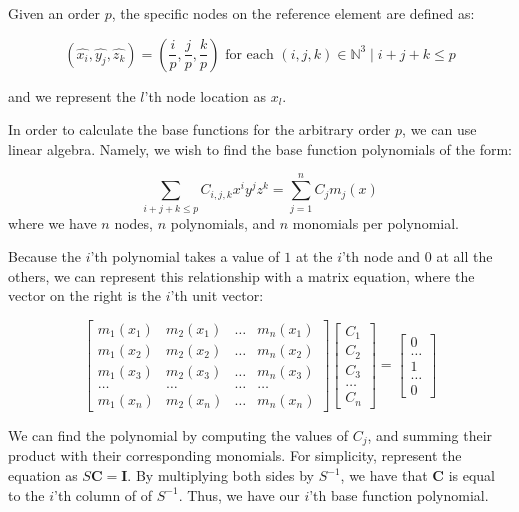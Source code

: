 Given an order $p$, the specific nodes on the reference element are defined as:

$$(\hat{x_i}, \hat{y_j}, \hat{z_k}) = \left( \frac{i}{p}, \frac{j}{p}, \frac{k}{p} \right) \text{ for each } (i,j,k) \in \mathbb{N}^3 \mid i + j + k \leq p$$ 

and we represent the $l$'th node location as $x_l$.

In order to calculate the base functions for the arbitrary order $p$, we can use linear algebra. Namely, we wish to find the base function polynomials of the form:

$$\sum\limits_{i+j+k \leq p} C_{i,j,k} x^i y^j z^k = \sum\limits_{j=1}^n C_j m_j(x)$$
where we have $n$ nodes, $n$ polynomials, and $n$ monomials per polynomial. 

Because the $i$'th polynomial takes a value of $1$ at the $i$'th node and $0$ at all the others, we can represent this relationship with a matrix equation, where the vector on the right is the $i$'th unit vector:

$$\begin{bmatrix}
m_1(x_1) & m_2(x_1) & \ldots & m_n(x_1) \\
m_1(x_2) & m_2(x_2) & \ldots & m_n(x_2)\\
m_1(x_3) & m_2(x_3) & \ldots & m_n(x_3) \\
\ldots   & \ldots   & \ldots & \ldots \\
m_1(x_n) & m_2(x_n) & \ldots & m_n(x_n) 
\end{bmatrix} 
\begin{bmatrix}
C_1 \\
C_2 \\
C_3 \\
\ldots \\
C_n
\end{bmatrix}
= \begin{bmatrix}
0 \\
\ldots \\
1 \\
\ldots \\
0
\end{bmatrix} $$

We can find the polynomial by computing the values of $C_j$,
and summing their product with their corresponding monomials. For simplicity, represent the equation as $S \boldsymbol{C} = \boldsymbol{I}$. By multiplying both sides by $S^{-1}$, we have that $\boldsymbol{C}$ is equal to the $i$'th column of of $S^{-1}$. Thus, we have our $i$'th base function polynomial.

